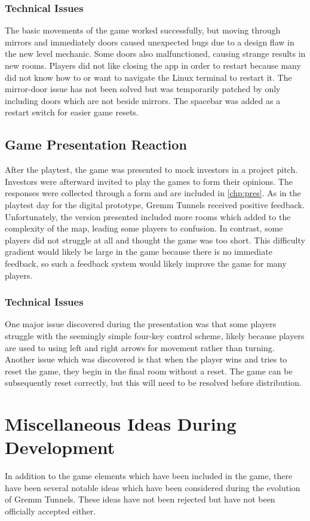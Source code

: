 \documentclass{scrreprt}
\begin{document}
				\subsubsection{Technical Issues}
					The basic movements of the game worked successfully, but moving through mirrors and immediately doors caused unexpected bugs due to a design flaw in the new level mechanic. Some doors also malfunctioned, causing strange results in new rooms. Players did not like closing the app in order to restart because many did not know how to or want to navigate the Linux terminal to restart it. The mirror-door issue has not been solved but was temporarily patched by only including doors which are not beside mirrors. The spacebar was added as a restart switch for easier game resets.
			
			\subsection{Game Presentation Reaction}
				After the playtest, the game was presented to mock investors in a project pitch. Investors were afterward invited to play the games to form their opinions. The responses were collected through a form and are included in \autoref{chp:pres}. As in the playtest day for the digital prototype, Gremm Tunnels received positive feedback. Unfortunately, the version presented included more rooms which added to the complexity of the map, leading some players to confusion. In contrast, some players did not struggle at all and thought the game was too short. This difficulty gradient would likely be large in the game because there is no immediate feedback, so such a feedback system would likely improve the game for many players.
				
				\subsubsection{Technical Issues}
					One major issue discovered during the presentation was that some players struggle with the seemingly simple four-key control scheme, likely because players are used to using left and right arrows for movement rather than turning. Another issue which was discovered is that when the player wins and tries to reset the game, they begin in the final room without a reset. The game can be subsequently reset correctly, but this will need to be resolved before distribution.
		
		\section{Miscellaneous Ideas During Development}
			In addition to the game elements which have been included in the game, there have been several notable ideas which have been considered during the evolution of Gremm Tunnels. These ideas have not been rejected but have not been officially accepted either.
			
\end{document}
